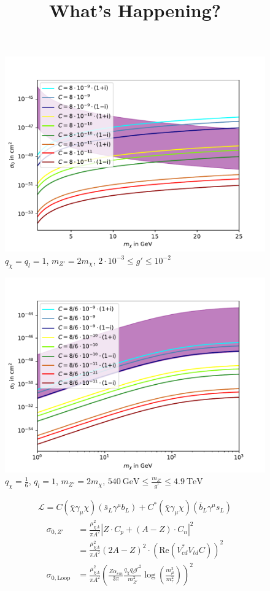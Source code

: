 \documentclass[a4,11pt]{article}
\title{What's Happening?}
\begin{document}
\begin{figure}[h]
	\centering
	\includegraphics[width=.75\textwidth]{SigmaNull1.pdf}
	\caption{$q_\chi = q_l = 1$, $m_{Z'} = 2m_\chi$, $2\cdot10^{-3}\leq g'\leq10^{-2}$}
\end{figure}
\begin{figure}[h]
	\centering
	\includegraphics[width=.75\textwidth]{SigmaNull2.pdf}
	\caption{$q_\chi = \frac{1}{6}$, $q_l = 1$, $m_{Z'} = 2m_\chi$, $\SI{540}{\giga\electronvolt}\leq\frac{m_{Z'}}{g'}\leq\SI{4.9}{\tera\electronvolt}$}
\end{figure}
\begin{align*}
	\mathcal{L} = C(\bar{\chi}\gamma_\mu\chi)(\bar{s}_L\gamma^\mu b_L) + C^*(\bar{\chi}\gamma_\mu\chi)(\bar{b}_L\gamma^\mu s_L)
\end{align*}
\begin{align*}
	\sigma_{0,Z'} &= \frac{\mu_{\chi A}^2}{\pi A^2}|Z\cdot C_p + (A-Z)\cdot C_n|^2 \\
	&= \frac{\mu_{\chi A}^2}{\pi A^2}(2A-Z)^2\cdot\left(\text{Re}(V_{cd}^*V_{td}C)\right)^2 \\
	\sigma_{0,\text{Loop}} &= \frac{\mu_{\chi A}^2}{\pi A^2}\left(\frac{Z\alpha_{em}}{3\pi}\frac{q_\chi q_l{g'}^2}{m_{Z'}^2}\log\left(\frac{m_\mu^2}{m_\tau^2}\right)\right)^2
\end{align*}
\end{document}
